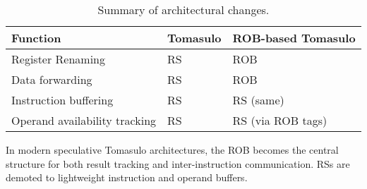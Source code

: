 \begin{table}[!htp]
    \centering
    \begin{tabular}{@{} l | l | l @{}}
        \toprule
        Function                        & Tomasulo & ROB-based Tomasulo \\
        \midrule
        Register Renaming               & RS       & ROB                \\ [.3em]
        Data forwarding                 & RS       & ROB                \\ [.3em]
        Instruction buffering           & RS       & RS (same)          \\ [.3em]
        Operand availability tracking   & RS       & RS (via ROB tags)  \\ [.3em]
        \bottomrule
    \end{tabular}
    \caption{Summary of architectural changes.}
\end{table}

\noindent
In modern speculative Tomasulo architectures, the ROB becomes the central structure for both result tracking and inter-instruction communication. RSs are demoted to lightweight instruction and operand buffers.